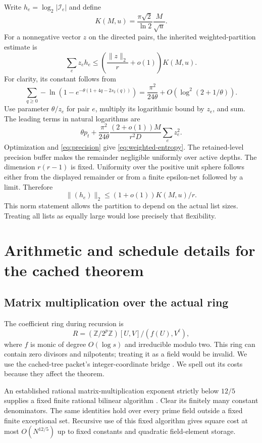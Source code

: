 \documentclass[11pt,letterpaper]{article}
\theoremstyle{remark}\newtheorem{remark}[theorem]{Remark}
\begin{document}
Write $h_e=\log_2|\mathcal I_e|$ and define
\[
 K(M,u)=\frac{\pi\sqrt2}{\ln2}\frac M{\sqrt u}.
\]
For a nonnegative vector $z$ on the directed pairs, the inherited
weighted-partition estimate is
\begin{equation}\label{eq:weighted-entropy}
 \sum_e z_e h_e\le
 \left(\frac{\|z\|_2}{r}+o(1)\right)K(M,u).
\end{equation}
For clarity, its constant follows from
\[
 \sum_{q\ge0}-\ln(1-e^{-\theta(1+4q-2s_2(q))})
 =\frac{\pi^2}{24\theta}+O(\log^2(2+1/\theta)).
\]
Use parameter $\theta/z_e$ for pair $e$, multiply its logarithmic bound
by $z_e$, and sum. The leading terms in natural logarithms are
\[
 \theta p_t+
 \frac{\pi^2}{24\theta}\frac{(2+o(1))M}{r^2D}
              \sum_e z_e^2.
\]
Optimization and \eqref{eq:precision} give
\eqref{eq:weighted-entropy}. The retained-level precision buffer makes
the remainder negligible uniformly over active depths. The dimension
$r(r-1)$ is fixed. Uniformity over the positive unit sphere follows either
from the displayed remainder or from a finite epsilon-net followed by a
limit. Therefore
\begin{equation}\label{eq:norm}
 \|(h_e)\|_2\le(1+o(1))K(M,u)/r.
\end{equation}
This norm statement allows the partition to depend on the actual list sizes.
Treating all lists as equally large would lose precisely that flexibility.



\section{Arithmetic and schedule details for the cached theorem}
\label{sec:schedule}

\subsection{Matrix multiplication over the actual ring}

The coefficient ring during recursion is
\[
 R=(\mathbb Z/2^p\mathbb Z)[U,V]/(f(U),V^\ell),
\]
where $f$ is monic of degree $O(\log s)$ and irreducible modulo two.
This ring can contain zero divisors and nilpotents; treating it as a field
would be invalid. We use the cached-tree packet's integer-coordinate bridge
\cite{tree}. We spell out its costs because they affect the theorem.

An established rational matrix-multiplication exponent strictly below
$12/5$ supplies a fixed finite rational bilinear algorithm
\cite{matrix}. Clear its finitely many constant denominators. The same
identities hold over every prime field outside a fixed finite exceptional
set. Recursive use of this fixed algorithm gives square cost at most
$O(N^{12/5})$ up to fixed constants and quadratic field-element storage.
\end{document}
